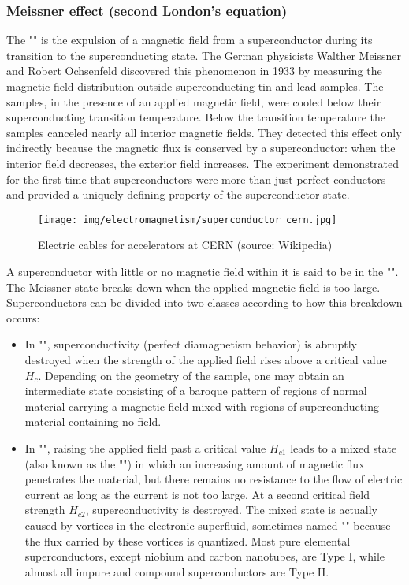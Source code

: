 	\subsubsection{Meissner effect (second London's equation)}
	The "" is the expulsion of a magnetic field from a superconductor during its transition to the superconducting state. The German physicists Walther Meissner and Robert Ochsenfeld discovered this phenomenon in 1933 by measuring the magnetic field distribution outside superconducting tin and lead samples. The samples, in the presence of an applied magnetic field, were cooled below their superconducting transition temperature. Below the transition temperature the samples canceled nearly all interior magnetic fields. They detected this effect only indirectly because the magnetic flux is conserved by a superconductor: when the interior field decreases, the exterior field increases. The experiment demonstrated for the first time that superconductors were more than just perfect conductors and provided a uniquely defining property of the superconductor state.
	\begin{figure}[H]
		\centering
		\texttt{[image: img/electromagnetism/superconductor\_cern.jpg]}
		\caption{Electric cables for accelerators at CERN (source: Wikipedia)}
	\end{figure}
	A superconductor with little or no magnetic field within it is said to be in the "". The Meissner state breaks down when the applied magnetic field is too large. Superconductors can be divided into two classes according to how this breakdown occurs:
	\begin{itemize}
		\item In "", superconductivity (perfect diamagnetism behavior) is abruptly destroyed when the strength of the applied field rises above a critical value $H_c$. Depending on the geometry of the sample, one may obtain an intermediate state consisting of a baroque pattern of regions of normal material carrying a magnetic field mixed with regions of superconducting material containing no field. 
		
		\item In "", raising the applied field past a critical value $H_{c1}$ leads to a mixed state (also known as the "") in which an increasing amount of magnetic flux penetrates the material, but there remains no resistance to the flow of electric current as long as the current is not too large. At a second critical field strength $H_{c2}$, superconductivity is destroyed. The mixed state is actually caused by vortices in the electronic superfluid, sometimes named "" because the flux carried by these vortices is quantized. Most pure elemental superconductors, except niobium and carbon nanotubes, are Type I, while almost all impure and compound superconductors are Type II.
	\end{itemize}
	
